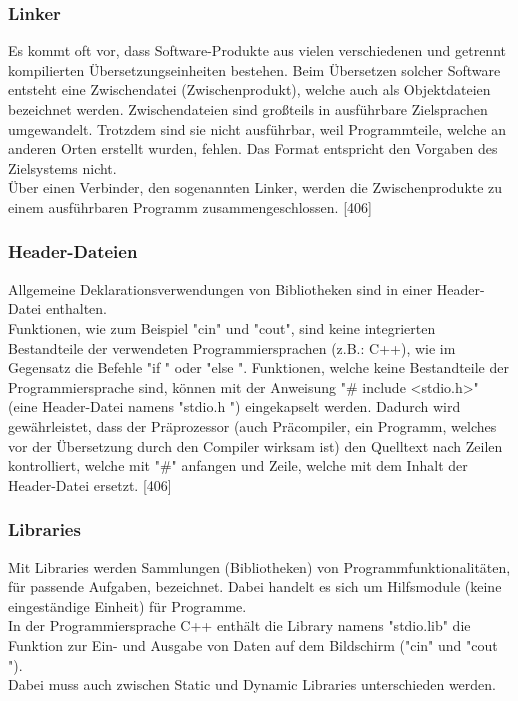 \documentclass[12pt,a4paper]{report}
\begin{document}
\begin{onehalfspace}
\subsubsection{Linker}
Es kommt oft vor, dass Software-Produkte aus vielen verschiedenen und getrennt kompilierten Übersetzungseinheiten bestehen. Beim Übersetzen solcher Software entsteht eine Zwischendatei (Zwischenprodukt), welche auch als Objektdateien bezeichnet werden. Zwischendateien sind großteils in ausführbare Zielsprachen umgewandelt. Trotzdem sind sie nicht ausführbar, weil Programmteile, welche an anderen Orten erstellt wurden, fehlen. Das Format entspricht den Vorgaben des Zielsystems nicht.
\\Über einen Verbinder, den sogenannten Linker, werden die Zwischenprodukte zu einem ausführbaren Programm zusammengeschlossen. [406]

\subsubsection{Header-Dateien}
Allgemeine Deklarationsverwendungen von Bibliotheken sind in einer Header-Datei enthalten.
\\Funktionen, wie zum Beispiel "{}cin"{} und "{}cout{}", sind keine integrierten Bestandteile der verwendeten Programmiersprachen (z.B.: C++), wie im Gegensatz die Befehle "{}if "{} oder "{}else "{}. Funktionen, welche keine Bestandteile der Programmiersprache sind, können mit der Anweisung "{}\# include \textless stdio.h\textgreater "{} (eine Header-Datei namens "{}stdio.h "{}) eingekapselt werden. Dadurch wird gewährleistet, dass der Präprozessor (auch Präcompiler, ein Programm, welches vor der Übersetzung durch den Compiler wirksam ist) den Quelltext nach Zeilen kontrolliert, welche mit "{}\#"{} anfangen und Zeile, welche mit dem Inhalt der Header-Datei ersetzt. [406]

\subsubsection{Libraries}
Mit Libraries werden Sammlungen (Bibliotheken) von Programmfunktionalitäten, für passende Aufgaben, bezeichnet. Dabei handelt es sich um Hilfsmodule (keine eingeständige Einheit) für Programme.\\
In der Programmiersprache C++ enthält die Library namens "{}stdio.lib"{} die Funktion zur Ein- und Ausgabe von Daten auf dem Bildschirm ("{}cin"{} und "{}cout "{}).\\
Dabei muss auch zwischen Static und Dynamic Libraries unterschieden werden.


\end{onehalfspace}
\end{document}
